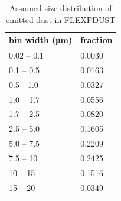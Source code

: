\begin{table}[htpb]
    \caption{Assumed size distribution of emitted dust in FLEXPDUST}
    \label{tab:size_distribution}
    \centering
    \begin{tabular}{@{}ll@{}} 
    \toprule
        bin width (\si{\micro\metre}) &  fraction \\ \midrule
         0.02 –  0.1 & 0.0030\\
         0.1 – 0.5 &  0.0163\\
         0.5 - 1.0 &0.0327\\
         1.0 – 1.7 & 0.0556\\
         1.7 – 2.5 & 0.0820\\
         2.5 – 5.0 &  0.1605\\
         5.0 – 7.5 & 0.2209\\
         7.5 – 10 & 0.2425\\
         10 – 15 & 0.1516 \\
         15 – 20 & 0.0349 
    \end{tabular}

\end{table}

